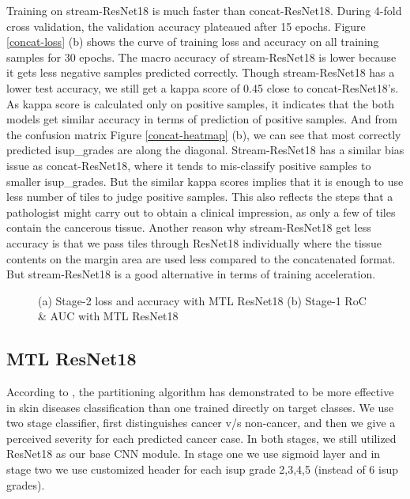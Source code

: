 \documentclass[10pt,twocolumn,letterpaper]{article}
\begin{document}
Training on stream-ResNet18 is much faster than concat-ResNet18. During 4-fold cross validation, the validation accuracy plateaued after 15 epochs. Figure \ref{concat-loss} (b) shows the curve of training loss and accuracy on all training samples for 30 epochs. The macro accuracy of stream-ResNet18 is lower because it gets less negative samples predicted correctly. Though stream-ResNet18 has a lower test accuracy, we still get a kappa score of 0.45 close to concat-ResNet18's. As kappa score is calculated only on positive samples, it indicates that the both models get similar accuracy in terms of prediction of positive samples. And from the confusion matrix Figure \ref{concat-heatmap} (b), we can see that most correctly predicted isup\_grades are along the diagonal. Stream-ResNet18 has a similar bias issue as concat-ResNet18, where it tends to mis-classify positive samples to smaller isup\_grades. But the similar kappa scores implies that it is enough to use less number of tiles to judge positive samples. This also reflects the steps that a pathologist might carry out to obtain a clinical impression, as only a few of tiles contain the cancerous tissue. Another reason why stream-ResNet18 get less accuracy is that we pass tiles through ResNet18 individually where the tissue contents on the margin area are used less compared to the concatenated format. But stream-ResNet18 is a good alternative in terms of training acceleration.

\begin{figure}[t]
\begin{center}
\end{center}
   \caption{(a) Stage-2 loss and accuracy with MTL ResNet18 (b) Stage-1 RoC \& AUC with MTL ResNet18}
\label{mtl-loss}
\end{figure}


\subsection{MTL ResNet18}
 According to \cite{Esteva:1476-4687}, the partitioning algorithm has demonstrated to be more effective in skin diseases classification than one trained directly on target classes. We use two stage classifier, first distinguishes cancer v/s non-cancer, and then we give a perceived severity for each predicted cancer case. In both stages, we still utilized ResNet18 as our base CNN module. In stage one we use sigmoid layer and in stage two we use customized header for each isup grade 2,3,4,5 (instead of 6 isup grades). \\
\end{document}
